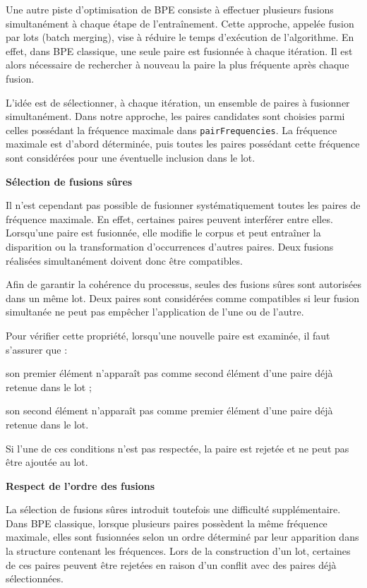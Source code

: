 \documentclass[12pt,a4paper]{report}
\begin{document}
	Une autre piste d’optimisation de BPE consiste à effectuer plusieurs fusions simultanément à chaque étape de l’entraînement. Cette approche, appelée fusion par lots (batch merging), vise à réduire le temps d’exécution de l’algorithme. En effet, dans BPE classique, une seule paire est fusionnée à chaque itération. Il est alors nécessaire de rechercher à nouveau la paire la plus fréquente après chaque fusion.
	
	L’idée est de sélectionner, à chaque itération, un ensemble de paires à fusionner simultanément. Dans notre approche, les paires candidates sont choisies parmi celles possédant la fréquence maximale dans \texttt{pairFrequencies}. La fréquence maximale est d’abord déterminée, puis toutes les paires possédant cette fréquence sont considérées pour une éventuelle inclusion dans le lot.
	
	\textbf{Sélection de fusions sûres}
	
	Il n’est cependant pas possible de fusionner systématiquement toutes les paires de fréquence maximale. En effet, certaines paires peuvent interférer entre elles. Lorsqu’une paire est fusionnée, elle modifie le corpus et peut entraîner la disparition ou la transformation d’occurrences d’autres paires. Deux fusions réalisées simultanément doivent donc être compatibles.
	
	Afin de garantir la cohérence du processus, seules des fusions sûres sont autorisées dans un même lot. Deux paires sont considérées comme compatibles si leur fusion simultanée ne peut pas empêcher l’application de l’une ou de l’autre.
	
	Pour vérifier cette propriété, lorsqu’une nouvelle paire est examinée, il faut s’assurer que :
	
	\begin{itemizeFB}
		\item son premier élément n’apparaît pas comme second élément d’une paire déjà retenue dans le lot ;
		\item son second élément n’apparaît pas comme premier élément d’une paire déjà retenue dans le lot.
	\end{itemizeFB}
	
	Si l’une de ces conditions n’est pas respectée, la paire est rejetée et ne peut pas être ajoutée au lot.
	
	\textbf{Respect de l’ordre des fusions}
	
	La sélection de fusions sûres introduit toutefois une difficulté supplémentaire. Dans BPE classique, lorsque plusieurs paires possèdent la même fréquence maximale, elles sont fusionnées selon un ordre déterminé par leur apparition dans la structure contenant les fréquences. Lors de la construction d’un lot, certaines de ces paires peuvent être rejetées en raison d’un conflit avec des paires déjà sélectionnées.
	
\end{document}
